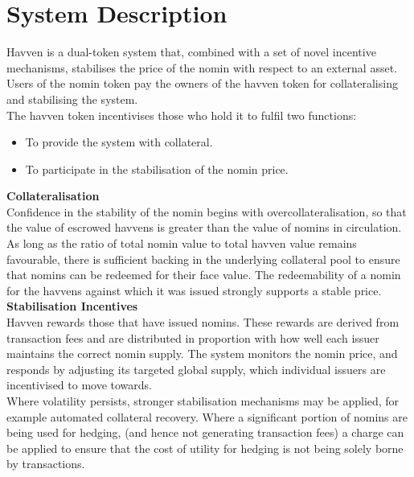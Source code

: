 \section{System Description} Havven is a dual-token system that, combined with a set of novel incentive mechanisms, stabilises the price of the nomin with respect to an external asset. Users of the nomin token pay the owners of the havven token for collateralising and stabilising the system. \\

\noindent The havven token incentivises those who hold it to fulfil two functions:

\begin{itemize}
\item{To provide the system with collateral.}
\item{To participate in the stabilisation of the nomin price.} \\
\end{itemize}

\noindent \textbf{Collateralisation} \\

\noindent Confidence in the stability of the nomin begins with overcollateralisation, so that the value of escrowed havvens is greater than the value of nomins in circulation. As long as the ratio of total nomin value to total havven value remains favourable, there is sufficient backing in the underlying collateral pool to ensure that nomins
can be redeemed for their face value. The redeemability of a nomin for the havvens against which it was issued strongly supports a stable price. \\

\noindent \textbf{Stabilisation Incentives} \\

\noindent Havven rewards those that have issued nomins. These rewards are derived from transaction fees and are distributed in proportion with how well each issuer maintains the correct nomin supply. The system monitors the nomin price, and responds by adjusting its targeted global supply, which individual issuers are incentivised to move towards. \\

\noindent Where volatility persists, stronger stabilisation mechanisms may be applied, for example automated collateral recovery. Where a significant portion of nomins are being used for hedging, (and hence not generating transaction fees) a charge can be applied to ensure that the cost of utility for hedging is not being solely borne by transactions.

